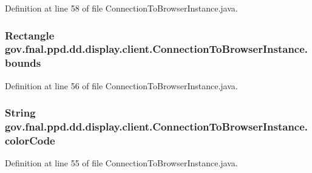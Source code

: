 Definition at line 58 of file Connection\-To\-Browser\-Instance.\-java.

\hypertarget{classgov_1_1fnal_1_1ppd_1_1dd_1_1display_1_1client_1_1ConnectionToBrowserInstance_a770b2f3f6f6e76626e45f2d73b23bd52}{
\subsubsection[{bounds}]{\setlength{\rightskip}{0pt plus 5cm}Rectangle gov.\-fnal.\-ppd.\-dd.\-display.\-client.\-Connection\-To\-Browser\-Instance.\-bounds\hspace{0.3cm}{\ttfamily [protected]}}}\label{classgov_1_1fnal_1_1ppd_1_1dd_1_1display_1_1client_1_1ConnectionToBrowserInstance_a770b2f3f6f6e76626e45f2d73b23bd52}


Definition at line 56 of file Connection\-To\-Browser\-Instance.\-java.

\hypertarget{classgov_1_1fnal_1_1ppd_1_1dd_1_1display_1_1client_1_1ConnectionToBrowserInstance_a487fdde372e9eaafe1b9a7f83d43db23}{
\subsubsection[{color\-Code}]{\setlength{\rightskip}{0pt plus 5cm}String gov.\-fnal.\-ppd.\-dd.\-display.\-client.\-Connection\-To\-Browser\-Instance.\-color\-Code\hspace{0.3cm}{\ttfamily [protected]}}}\label{classgov_1_1fnal_1_1ppd_1_1dd_1_1display_1_1client_1_1ConnectionToBrowserInstance_a487fdde372e9eaafe1b9a7f83d43db23}


Definition at line 55 of file Connection\-To\-Browser\-Instance.\-java.

